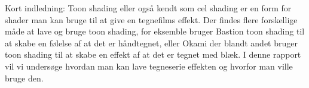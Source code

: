 Kort indledning:
Toon shading eller også kendt som cel shading er en form for shader man kan bruge til at give en tegnefilms effekt. Der findes flere forskellige måde at lave og bruge toon shading, for eksemble bruger Bastion toon shading til at skabe en følelse af at det er håndtegnet, eller Okami der blandt andet bruger toon shading til at skabe en effekt af at det er tegnet med blæk. I denne rapport vil vi undersøge hvordan man kan lave tegneserie effekten og hvorfor man ville bruge den.